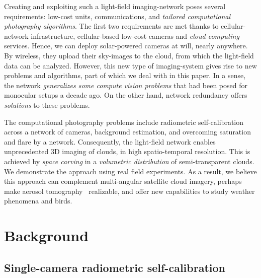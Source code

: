 \documentclass[runningheads]{llncs}
\begin{document}
Creating and exploiting such a light-field imaging-network poses several requirements: low-cost units,
communications, and {\em tailored computational photography algorithms}. The first two requirements are met  thanks to cellular-network infrastructure, cellular-based low-cost cameras and {\em cloud computing} services. Hence, we can deploy solar-powered cameras at will, nearly anywhere. By wireless, they upload their sky-images to the cloud, from which the light-field data can be analyzed. However, this new type of imaging-system gives rise to new problems and algorithms, part of which we deal with in this paper. In a sense, the network {\em generalizes some compute vision problems} that had been posed for monocular setups a decade ago. On the other hand, network redundancy offers {\em solutions} to these problems.

The computational photography problems include radiometric self-calibration across a network of cameras, background estimation, and overcoming saturation and flare by a network. Consequently, the light-field network enables unprecedented 3D imaging of clouds, in high spatio-temporal resolution. This is achieved by {\em space carving} in a {\em volumetric distribution} of semi-transparent clouds. We demonstrate the approach using real field experiments.%
As a result, we believe this approach can complement multi-angular satellite cloud imagery, perhaps make aerosol tomography~\cite{Aides:13} realizable, and offer new capabilities to study weather phenomena and birds.



\section{Background}
\label{sec:theory}

\subsection{Single-camera radiometric self-calibration}
\label{sec:Signelradio}
\end{document}
